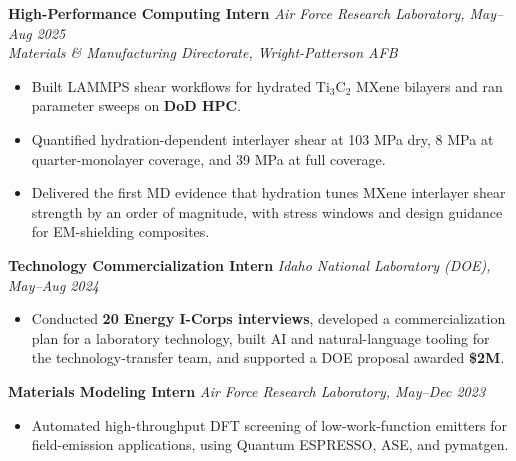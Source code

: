 \documentclass[letterpaper,10pt]{article}
\newcommand{\keep}{\needspace{4\baselineskip}}
\begin{document}
\keep\textbf{High-Performance Computing Intern} \hfill \textit{Air Force Research Laboratory, May--Aug 2025}\\
\textit{Materials \& Manufacturing Directorate, Wright-Patterson AFB}
\begin{itemize}
    \item Built LAMMPS shear workflows for hydrated Ti\(_3\)C\(_2\) MXene bilayers and ran parameter sweeps on \textbf{DoD HPC}.
    \item Quantified hydration-dependent interlayer shear at 103 MPa dry, 8 MPa at quarter-monolayer coverage, and 39 MPa at full coverage.
    \item Delivered the first MD evidence that hydration tunes MXene interlayer shear strength by an order of magnitude, with stress windows and design guidance for EM-shielding composites.
\end{itemize}

\keep\textbf{Technology Commercialization Intern} \hfill \textit{Idaho National Laboratory (DOE), May--Aug 2024}
\begin{itemize}
    \item Conducted \textbf{20 Energy I-Corps interviews}, developed a commercialization plan for a laboratory technology, built AI and natural-language tooling for the technology-transfer team, and supported a DOE proposal awarded \textbf{\$2M}.
\end{itemize}

\keep\textbf{Materials Modeling Intern} \hfill \textit{Air Force Research Laboratory, May--Dec 2023}
\begin{itemize}
    \item Automated high-throughput DFT screening of low-work-function emitters for field-emission applications, using Quantum ESPRESSO, ASE, and pymatgen.
\end{itemize}
\end{document}
